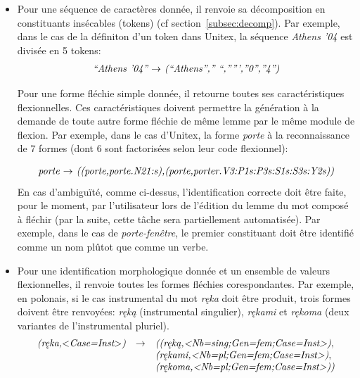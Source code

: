 \begin{itemize}
\item Pour une séquence de caractères donnée, il renvoie sa décomposition en constituants insécables 
(tokens) (cf section~\ref{subsec:decomp}). Par exemple, dans le cas de la définiton d'un token dans
Unitex, la séquence \emph{Athens '04} est divisée en 5 tokens:
\[
\begin{array}[l]{l}
\emph{``Athens '04'' $\rightarrow$ (``Athens'','' ``,''''',''0'',''4'')}
\end{array}
\]

Pour une forme fléchie simple donnée, il retourne toutes ses caractéristiques flexionnelles. Ces
caractéristiques doivent permettre la génération à la demande de toute autre forme fléchie de même
lemme par le même module de flexion.
Par exemple, dans le cas d'Unitex, la forme \emph{porte} à  la reconnaissance de 7 formes 
(dont 6 sont factorisées selon leur code flexionnel):

\[
\begin{array}[l]{l}
\emph{porte $\rightarrow$ ((porte,porte.N21:s),(porte,porter.V3:P1s:P3s:S1s:S3s:Y2s))}
\end{array}
\]
En cas d'ambiguïté, comme ci-dessus, l'identification correcte doit être faite, pour le moment,
par l'utilisateur lors de l'édition du lemme du mot composé à fléchir (par la  suite, cette tâche
sera partiellement automatisée). Par exemple, dans le cas de \emph{porte-fenêtre}, le premier
constituant doit être identifié comme un nom plûtot que comme un verbe.

\item Pour une identification morphologique donnée et un ensemble de valeurs flexionnelles, il
renvoie toutes les formes fléchies corespondantes. Par exemple, en polonais, si le cas instrumental
du mot \emph{r\k{e}ka} doit être produit, trois formes doivent être renvoyées: \emph{r\k{e}k\k{a}} 
(instrumental singulier), \emph{r\k{e}kami} et  \emph{r\k{e}koma} (deux variantes de l'instrumental
pluriel).
\[
\begin{array}[l]{lll}
\emph{(r\k{e}ka,$<$Case=Inst$>$)}&  \rightarrow    &
\emph{((r\k{e}k\k{a},<Nb=sing;Gen=fem;Case=Inst>)}, \\
                                    &              & \emph{(r\k{e}kami,<Nb=pl;Gen=fem;Case=Inst>)},
                                    \\
                                    &              & \emph{(r\k{e}koma,<Nb=pl;Gen=fem;Case=Inst>))}
\end{array}
\]
\end{itemize}

